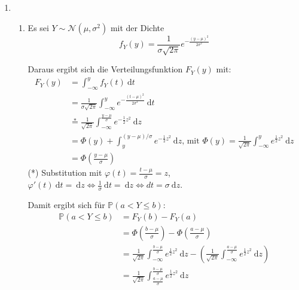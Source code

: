 \documentclass[a4paper]{scrartcl}
\newcommand{\dif}{\ \mathrm{d}}
\def \blattnr {5}
\begin{document}
\begin{enumerate}[label=\bfseries \blattnr.\arabic*]
\begin{enumerate}
        \end{enumerate}
   
    \item
        \begin{enumerate}
            \item
	      Es sei $Y \sim \mathcal{N}(\mu, \sigma^2)$ mit der Dichte
	      \begin{equation*}
		  f_Y(y) = \frac1{\sigma\sqrt{2\pi}} e^{-\frac{(y-\mu)^2}{2\sigma^2}}
	      \end{equation*}
	      
	      Daraus ergibt sich die Verteilungsfunktion $F_Y(y)$ mit:
	      \begin{equation*}
		\begin{split}
		  F_Y(y) 
		  &= \int_{-\infty}^y f_Y(t) \dif t \\ 
		  &= \frac1{\sigma\sqrt{2\pi}} \int_ {-\infty}^y e^{-\frac{(t-\mu)^2}{2\sigma^2}} \dif t\\
		  &\stackrel{*}{=} \frac1{\sqrt{2\pi}} \int_{-\infty}^{\frac{y-\mu}\sigma} e^{-\frac12z^2} \dif z \\
		  &= \Phi(y) + \int_y^{(y-\mu)/\sigma} e^{-\frac12z^2} \dif z \text{, mit } \Phi(y) = \frac1{\sqrt{2\pi}} \int_{-\infty}^y e^{\frac12z^2} \dif z \\
		  & =\Phi\left(\frac{y-\mu}\sigma\right)
		 \end{split}
	      \end{equation*}
	      (*) Substitution mit $\varphi(t) = \frac{t-\mu}{\sigma} = z$, \\
	      $\varphi'(t) \dif t = \dif z \Leftrightarrow \frac1\sigma \dif t = \dif z \Leftrightarrow dt = \sigma \dif z$.
	      
	      Damit ergibt sich für $\mathbb{P}(a < Y \leq b)$:
	      \begin{equation*}
		\begin{split}
		  \mathbb{P}(a < Y \leq b)
		  &= F_Y(b) - F_Y(a) \\
		  &= \Phi\left( \frac{b - \mu}\sigma\right) - \Phi\left(\frac{a-\mu}\sigma\right) \\
		  &= \frac1{\sqrt{2\pi}} \int_{-\infty}^{\frac{b - \mu}\sigma} e^{\frac12z^2} \dif z - \left(\frac1{\sqrt{2\pi}} \int_{-\infty}^{\frac{a-\mu}\sigma} e^{\frac12z^2} \dif z \right) \\
		  &= \frac1{\sqrt{2\pi}} \int_{\frac{a-\mu}\sigma}^{\frac{b - \mu}\sigma} e^{\frac12z^2} \dif z 
		 \end{split}
	      \end{equation*}
	  

\end{enumerate}
\end{enumerate}
\end{document}
